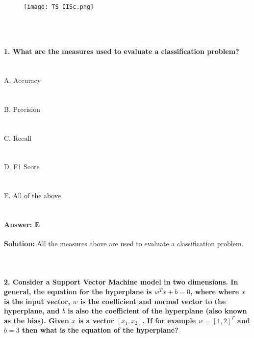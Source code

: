 \documentclass[prl,twocolumn,showpacs,preprintnumbers,superscriptaddress]{revtex4}
\theoremstyle{plain}
\theoremstyle{definition}
\begin{document}
\begin{widetext}
\\
\\
\\

\begin{wrapfigure}
\centering
\end{wrapfigure}
\begin{figure}[h!]
 \begin{right}
  \hfill\texttt{[image: TS\_IISc.png]}
 \end{right}
\end{figure}
\\
\\
\\
\noindent\textbf{1. What are the measures used to evaluate a classification problem?}
\\
\\
\\
\noindent A. Accuracy
\\
\\
\\
B. Precision
\\
\\
\\
C. Recall
\\
\\
\\
D. F1 Score
\\
\\
\\
E. All of the above
\\
\\
\\
\textbf{Answer: E}
\\
\\
\textbf{Solution:} All the measures above are used to evaluate a classification problem.
\\
\\
\\
\\
\textbf{2. Consider a Support Vector Machine model in two dimensions. In general, the equation for the hyperplane is $w^T x + b = 0$, where where $x$ is the input vector, $w$ is the coefficient and normal vector to the hyperplane, and $b$ is also the coefficient of the hyperplane (also known as the bias). Given $x$ is a vector  $[x_{1}, x_{2}]$.  If for example $w = [1,2]^T$ and $b = 3$ then what is the equation of the hyperplane?}
\\
\\

\end{widetext}
\end{document}
